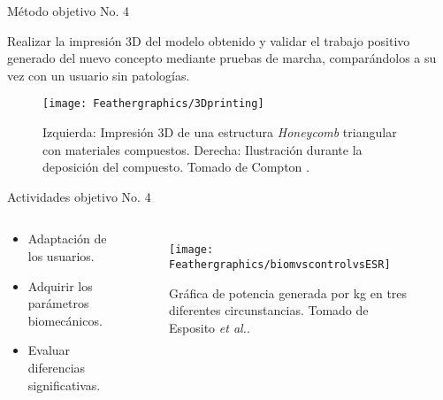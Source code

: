 \documentclass[10pt]{beamer}
\begin{document}
\begin{frame}{Método objetivo No. 4}

\begin{block}{}{\begin{footnotesize}
Realizar la impresión 3D del modelo obtenido y validar el trabajo positivo generado del nuevo concepto mediante pruebas de marcha, comparándolos a su vez con un usuario sin
patologías.\end{footnotesize}}


\begin{figure}
\begin{centering}
\texttt{[image: Feathergraphics/3Dprinting]}
\par\end{centering}
\caption{{\footnotesize Izquierda: Impresión 3D de una estructura \emph{Honeycomb} triangular con materiales compuestos. Derecha: Ilustración durante la deposición del compuesto. Tomado de Compton \cite{Compton2014}.}}

\end{figure}
\end{block}

\end{frame}

\begin{frame}{Actividades objetivo No. 4}

\begin{columns}[t]


\column{30 mm}
\begin{exampleblock}{}

\begin{itemize}[label={$\checkmark$}]
\item {\footnotesize{}Adaptación de los usuarios.}{\footnotesize \par}
\vspace{8 mm}
\item {\footnotesize{}Adquirir los parámetros biomecánicos.}
\vspace{8 mm}
\item {\footnotesize{Evaluar diferencias significativas.}}
\end{itemize}
\end{exampleblock}

\column{80 mm}

\begin{figure}
\begin{centering}
{\scriptsize{}\texttt{[image: Feathergraphics/biomvscontrolvsESR]}}
\par\end{centering}{\scriptsize \par}
\caption{{\scriptsize{}Gráfica de potencia generada por kg en tres diferentes circunstancias. Tomado de Esposito \emph{et al.}\cite{Esposito2015}.}}
\end{figure}

\end{columns}

\end{frame}
\end{document}
